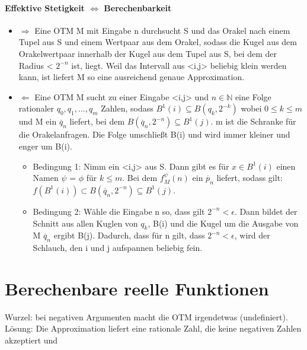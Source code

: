 \documentclass[ngerman]{scrartcl}
\begin{document}
\paragraph{Effektive Stetigkeit $ \Leftrightarrow $ Berechenbarkeit}
\begin{itemize}
  \item $ \Rightarrow $ Eine OTM M mit Eingabe n durchsucht S und das Orakel nach einem Tupel aus S und einem Wertpaar aus dem Orakel, sodass die Kugel aus dem Orakelwertpaar innerhalb der Kugel aus dem Tupel aus S, bei dem der Radius < $ 2^{-n}$ ist, liegt. Weil das Intervall aus <i,j> beliebig klein werden kann, ist liefert M so eine ausreichend genaue Approximation.
  \item $ \Leftarrow $ Eine OTM M sucht zu einer Eingabe <i,j>  und $ n\in \mathbb{N}$ eine Folge rationaler $ q_0,q_1,...,q_m$ Zahlen, sodass $ B^1(i) \subseteq B(q_k, 2^{-k}) $ wobei $ 0 \leq k \leq m $ und M ein $ \overline{q}_n $ liefert, bei dem $ B(\overline{q}_n, 2^{-n}) \subseteq B^1(j)$. m ist die Schranke für die Orakelanfragen. Die Folge umschließt B(i) und wird immer kleiner und enger um B(i).
  \begin{itemize}
    \item Bedingung 1: Nimm ein <i,j> aus S. Dann gibt es für $ x \in B^1(i) $ einen Namen $ \psi $ = $ \phi $ für $ k \leq m $. Bei dem $ f^\psi_M (n) $ ein $ \overline{p}_n $ liefert, sodass gilt: $ f(B^1(i)) \subset B(\overline{q}_n, 2^{-n}) \subseteq B^1(j) $.
    \item Bedingung 2: Wähle die Eingabe n so, dass gilt $ 2^{-n} < \epsilon $. Dann bildet der Schnitt aus allen Kuglen von $q_k$, B(i) und die Kugel um die Ausgabe von M $ \overline{q}_n $ ergibt B(j). Dadurch, dass für n gilt, dass $ 2^{-n} < \epsilon$, wird der Schlauch, den i und j aufspannen beliebig fein.
  \end{itemize}

\end{itemize}


%
%
\section{Berechenbare reelle Funktionen}
Wurzel: bei negativen Argumenten macht die OTM irgendetwas (undefiniert). Lösung: Die Approximation liefert eine rationale Zahl, die keine negativen Zahlen akzeptiert und


%
%
\end{document}
